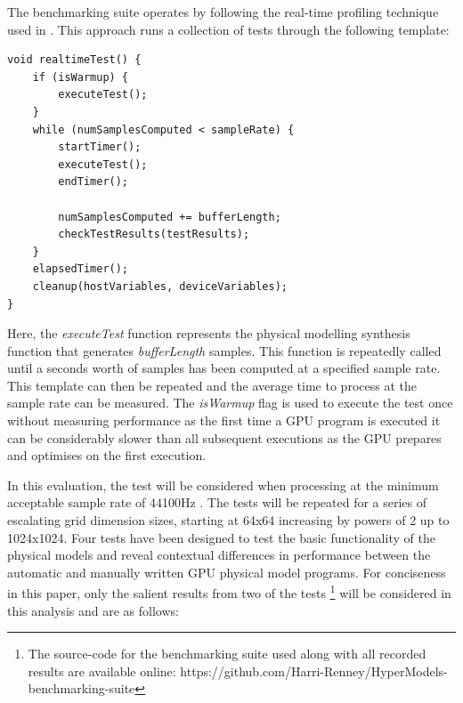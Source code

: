 \documentclass[sigconf]{nimeart}
\begin{document}
The benchmarking suite operates by following the real-time profiling technique used in \cite{RenneyThere}. This approach runs a collection of tests through the following template:

\begin{Verbatim}[breaklines=true,breakanywhere=true,fontsize=\footnotesize]
void realtimeTest() {
    if (isWarmup) {
        executeTest();
    }
    while (numSamplesComputed < sampleRate) {
        startTimer();
        executeTest();
        endTimer();
    
        numSamplesComputed += bufferLength;
        checkTestResults(testResults);
    }
    elapsedTimer();
    cleanup(hostVariables, deviceVariables);
}
\end{Verbatim}

Here, the \emph{executeTest} function represents the physical modelling synthesis function that generates \emph{bufferLength} samples. This function is repeatedly called until a seconds worth of samples has been computed at a specified sample rate. This template can then be repeated and the average time to process at the sample rate can be measured. The \emph{isWarmup} flag is used to execute the test once without measuring performance as the first time a GPU program is executed it can be considerably slower than all subsequent executions as the GPU prepares and optimises on the first execution.

In this evaluation, the test will be considered when processing at the minimum acceptable sample rate of 44100Hz \cite{Lavry2004Sampling}. The tests will be repeated for a series of escalating grid dimension sizes, starting at 64x64 increasing by powers of 2 up to 1024x1024. Four tests have been designed to test the basic functionality of the physical models and reveal contextual differences in performance between the automatic and manually written GPU physical model programs. For conciseness in this paper, only the salient results from two of the tests \footnote{The source-code for the benchmarking suite used along with all recorded results are available online: https://github.com/Harri-Renney/HyperModels-benchmarking-suite} will be considered in this analysis and are as follows:
\end{document}
